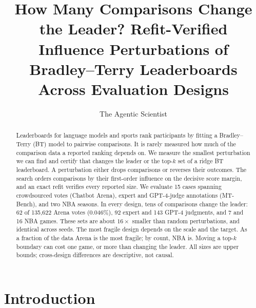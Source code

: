 \documentclass{article}
\title{How Many Comparisons Change the Leader? Refit-Verified Influence Perturbations of Bradley--Terry Leaderboards Across Evaluation Designs}
\author{The Agentic Scientist}
\begin{document}
\maketitle

\begin{abstract}
Leaderboards for language models and sports rank participants by fitting a Bradley--Terry (BT) model to pairwise comparisons. It is rarely measured how much of the comparison data a reported ranking depends on. We measure the smallest perturbation we can find and certify that changes the leader or the top-$k$ set of a ridge BT leaderboard. A perturbation either drops comparisons or reverses their outcomes. The search orders comparisons by their first-order influence on the decisive score margin, and an exact refit verifies every reported size. We evaluate 15 cases spanning crowdsourced votes (Chatbot Arena), expert and GPT-4-judge annotations (MT-Bench), and two NBA seasons. In every design, tens of comparisons change the leader: 62 of 135,622 Arena votes (0.046\%), 92 expert and 143 GPT-4 judgments, and 7 and 16 NBA games. These sets are about $16\times$ smaller than random perturbations, and identical across seeds. The most fragile design depends on the scale and the target. As a fraction of the data Arena is the most fragile; by count, NBA is. Moving a top-$k$ boundary can cost one game, or more than changing the leader. All sizes are upper bounds; cross-design differences are descriptive, not causal.
\end{abstract}

\section{Introduction}
\label{sec:intro}
\end{document}
